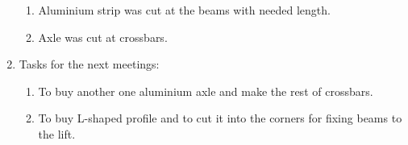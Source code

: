 \begin{enumerate}
\begin{enumerate}
      \item Aluminium strip was cut at the beams with needed length.
      
      \item Axle was cut at crossbars.
      
    \end{enumerate}
    
	\item Tasks for the next meetings:
	\begin{enumerate}
	  \item To buy another one aluminium axle and make the rest of crossbars.
	  
	  \item To buy L-shaped profile and to cut it into the corners for fixing beams to the lift.

    \end{enumerate}     
\end{enumerate}
\fillpage
